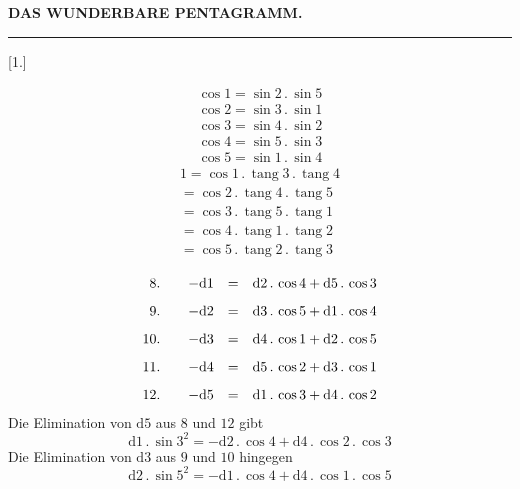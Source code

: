 \begingroup
\renewcommand{\arraystretch}{1.45}
\clearpage{}

\begin{center}
\textbf{DAS WUNDERBARE PENTAGRAMM.}

\rule{39.96bp}{0.35pt}
\end{center}

\begin{center}
\resizebox{.94\linewidth}{!}{}
\end{center}



\par\medskip{}\centerline{[1.]}\nobreak\smallskip
\[
\begin{gathered}
\cos 1=\sin 2\, .\,\sin 5\\[8pt]
\cos 2=\sin 3\, .\,\sin 1\\[8pt]
\cos 3=\sin 4\, .\,\sin 2\\[8pt]
\cos 4=\sin 5\, .\,\sin 3\\[8pt]
\cos 5=\sin 1\, .\,\sin 4
\end{gathered}
\]
\[
\begin{gathered}
1=\cos 1\, .\,\operatorname{tang}3\, .\,\operatorname{tang}4\\[8pt]
 =\cos 2\, .\,\operatorname{tang}4\, .\,\operatorname{tang}5\\[8pt]
 =\cos 3\, .\,\operatorname{tang}5\, .\,\operatorname{tang}1\\[8pt]
 =\cos 4\, .\,\operatorname{tang}1\, .\,\operatorname{tang}2\\[8pt]
 =\cos 5\, .\,\operatorname{tang}2\, .\,\operatorname{tang}3
\end{gathered}
\]

\[
\begin{array}{r@{\qquad}rcl}
8.&-\mathrm{d}1&=&\mathrm{d}2\, .\,\cos 4+\mathrm{d}5\, .\,\cos 3\\[8pt]
9.&-\mathrm{d}2&=&\mathrm{d}3\, .\,\cos 5+\mathrm{d}1\, .\,\cos 4\\[8pt]
10.&-\mathrm{d}3&=&\mathrm{d}4\, .\,\cos 1+\mathrm{d}2\, .\,\cos 5\\[8pt]
11.&-\mathrm{d}4&=&\mathrm{d}5\, .\,\cos 2+\mathrm{d}3\, .\,\cos 1\\[8pt]
12.&-\mathrm{d}5&=&\mathrm{d}1\, .\,\cos 3+\mathrm{d}4\, .\,\cos 2
\end{array}
\]
Die Elimination von $\mathrm{d}5$ aus $8$ und $12$ gibt
\[
\mathrm{d}1\, .\,\sin 3^2=-\mathrm{d}2\, .\,\cos 4+\mathrm{d}4\, .\,\cos 2\, .\,\cos 3
\]
Die Elimination von $\mathrm{d}3$ aus $9$ und $10$ hingegen
\[
\mathrm{d}2\, .\,\sin 5^2=-\mathrm{d}1\, .\,\cos 4+\mathrm{d}4\, .\,\cos 1\, .\,\cos 5
\]
\clearpage
\endgroup

